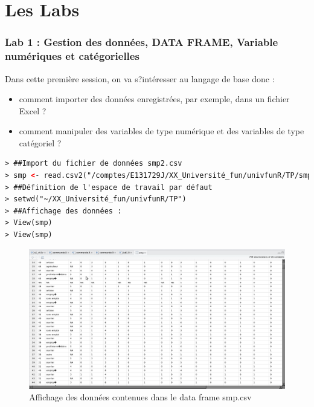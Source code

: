 \part{Les Labs}

\section{Lab 1 : Gestion des données, DATA FRAME, Variable numériques et catégorielles}

Dans cette première session, on va s?intéresser au langage de base donc :
\begin{itemize}
\item comment importer des données enregistrées, par exemple, dans un fichier Excel ?
\item comment manipuler des variables de type numérique et des variables de type catégoriel ?
\end{itemize}

\begin{lstlisting}[language=html]
> ##Import du fichier de données smp2.csv
> smp <- read.csv2("/comptes/E131729J/XX_Université_fun/univfunR/TP/smp2.csv")
> ##Définition de l'espace de travail par défaut
> setwd("~/XX_Université_fun/univfunR/TP")
> ##Affichage des données :
> View(smp)
> View(smp)
\end{lstlisting}

\begin{figure}[H]\begin{center}\includegraphics[scale=0.35]{ilu/lab1smp.png}\caption{Affichage des données contenues dans le data frame smp.csv}\end{center}\end{figure}

